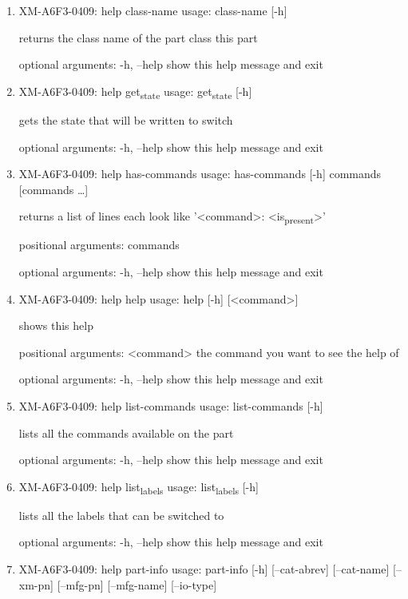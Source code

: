 \documentclass[11pt]{article}
\begin{document}
\begin{enumerate}
\item XM-A6F3-0409: help class-name
\label{sec:orgde6712d}
usage: class-name [-h]

returns the class name of the part class this part

optional arguments:
  -h, --help  show this help message and exit

\item XM-A6F3-0409: help get\textsubscript{state}
\label{sec:orged422ec}
usage: get\textsubscript{state} [-h]

gets the state that will be written to switch

optional arguments:
  -h, --help  show this help message and exit

\item XM-A6F3-0409: help has-commands
\label{sec:org5491ccf}
usage: has-commands [-h] commands [commands \ldots{}]

returns a list of lines each look like '<command>: <is\textsubscript{present}>'

positional arguments:
  commands

optional arguments:
  -h, --help  show this help message and exit

\item XM-A6F3-0409: help help
\label{sec:org905cc54}
usage: help [-h] [<command>]

shows this help

positional arguments:
  <command>   the command you want to see the help of

optional arguments:
  -h, --help  show this help message and exit

\item XM-A6F3-0409: help list-commands
\label{sec:orga2f295e}
usage: list-commands [-h]

lists all the commands available on the part

optional arguments:
  -h, --help  show this help message and exit

\item XM-A6F3-0409: help list\textsubscript{labels}
\label{sec:org18f8af4}
usage: list\textsubscript{labels} [-h]

lists all the labels that can be switched to

optional arguments:
  -h, --help  show this help message and exit

\item XM-A6F3-0409: help part-info
\label{sec:org86684e9}
usage: part-info  [-h] [--cat-abrev] [--cat-name] [--xm-pn] [--mfg-pn] [--mfg-name]
        [--io-type]


\end{enumerate}
\end{document}
